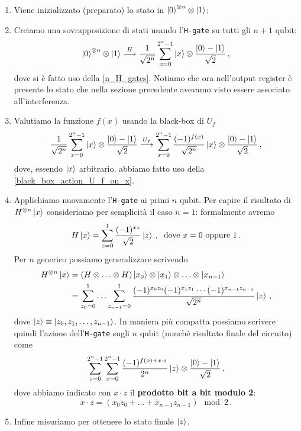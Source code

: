 \begin{enumerate}
    \item Viene inizializzato (preparato) lo stato in $\ket{0}^{\otimes n} \otimes \ket{1}$;
    \item Creiamo una sovrapposizione di stati usando l'\texttt{H-gate} su tutti gli $n+1$ qubit:
        \begin{equation*}
            \ket{0}^{\otimes n} \otimes \ket{1} \overset{H}{\longrightarrow} \frac{1}{\sqrt {2^n}}\sum_{x=0}^{2^n-1}\ket x \otimes \frac{\ket 0 - \ket 1}{\sqrt 2} \, ,
        \end{equation*}
        dove si è fatto uso della \eqref{n_H_gates}. Notiamo che ora nell'output register è presente lo stato che nella sezione precedente avevamo visto essere associato all'interferenza. 
    \item Valutiamo la funzione $f(x)$ usando la black-box di $U_f$
        \begin{equation*}
            \frac{1}{\sqrt {2^n}}\sum_{x=0}^{2^n-1}\ket x \otimes \frac{\ket 0 - \ket 1}{\sqrt 2} \overset{U_f}{\longrightarrow} \sum_{x=0}^{2^n-1}\frac{(-1)^{f(x)}}{\sqrt{2^n}}\ket x \otimes \frac{\ket 0 - \ket 1}{\sqrt 2} \, ,
        \end{equation*}
        dove, essendo $\ket{x}$ arbitrario, abbiamo fatto uso della \eqref{black_box_action_U_f_on_x}. 
    \item Applichiamo nuovamente l'\texttt{H-gate} ai primi $n$ qubit. Per capire il risultato di $H^{\otimes n} \ket{x}$ consideriamo per semplicità il caso $n=1$: formalmente avremo 
    \begin{equation*}
        H \ket{x} = \sum_{z = 0}^1 \frac{(-1)^{xz}}{\sqrt{2}} \ket{z} \, , \; \text{ dove } x = 0 \text{ oppure } 1 \, .
    \end{equation*}
    Per $n$ generico possiamo generalizzare scrivendo
    \begin{align*}
        H^{\otimes n} \ket{x} &= (H \otimes \ldots \otimes H) \ket{x_0} \otimes \ket{x_1} \otimes \ldots \otimes \ket{x_{n-1}} \\
        &= \sum_{z_0=0}^1 \ldots \sum_{z_{n-1}=0}^1 \frac{(-1)^{x_0 z_0} (-1)^{x_1 z_1} \cdots (-1)^{x_{n-1} z_{n-1}}}{\sqrt{2^n}} \ket{z} \, ,
    \end{align*}
    dove $\ket{z} \equiv \ket{z_0, z_1, \ldots, z_{n-1}}$. In maniera più compatta possiamo scrivere quindi l'azione dell'\texttt{H-gate} sugli $n$ qubit (nonché risultato finale del circuito) come
        \begin{equation}\label{output_Deutsch_Jozsa}
            \sum_{z = 0}^{2^n-1} \sum_{x = 0}^{2^n-1} \frac{(-1)^{f(x) + x \cdot z}}{2^n}\ket z \otimes \frac{\ket 0 - \ket 1}{\sqrt 2} \, ,
        \end{equation}
        dove abbiamo indicato con $x\cdot z$ il \textbf{prodotto bit a bit modulo 2}:
        \begin{equation*}
            x\cdot z = (x_0z_0 + \ldots + x_{n-1}z_{n-1}) \mod{2} \, .
        \end{equation*}
    \item Infine misuriamo per ottenere lo stato finale $\ket{z}$. 
\end{enumerate}

